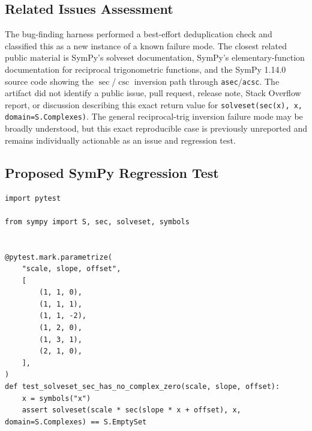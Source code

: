 \documentclass[11pt]{article}
\begin{document}
\subsection{Related Issues Assessment}

The bug-finding harness performed a best-effort deduplication check and
classified this as a new instance of a known failure mode. The closest related
public material is SymPy's solveset documentation, SymPy's elementary-function
documentation for reciprocal trigonometric functions, and the SymPy 1.14.0
source code showing the \(\sec\)/\(\csc\) inversion path through
\texttt{asec}/\texttt{acsc}. The artifact did not identify a public issue, pull
request, release note, Stack Overflow report, or discussion describing this
exact return value for \texttt{solveset(sec(x), x, domain=S.Complexes)}. The
general reciprocal-trig inversion failure mode may be broadly understood, but
this exact reproducible case is previously unreported and remains individually
actionable as an issue and regression test.

\subsection{Proposed SymPy Regression Test}

\medskip

\begin{lstlisting}[style=bugpython]
import pytest

from sympy import S, sec, solveset, symbols


@pytest.mark.parametrize(
    "scale, slope, offset",
    [
        (1, 1, 0),
        (1, 1, 1),
        (1, 1, -2),
        (1, 2, 0),
        (1, 3, 1),
        (2, 1, 0),
    ],
)
def test_solveset_sec_has_no_complex_zero(scale, slope, offset):
    x = symbols("x")
    assert solveset(scale * sec(slope * x + offset), x, domain=S.Complexes) == S.EmptySet
\end{lstlisting}
\end{document}
